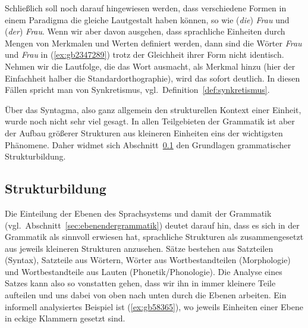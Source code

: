Schließlich soll noch darauf hingewiesen werden, dass verschiedene Formen in einem Paradigma die gleiche Lautgestalt haben können, so wie (\textit{die}) \textit{Frau} und (\textit{der}) \textit{Frau}.
Wenn wir aber davon ausgehen, dass sprachliche Einheiten durch Mengen von Merkmalen und Werten definiert werden, dann sind die Wörter \textit{Frau} und \textit{Frau} in (\ref{ex:gb2347289}) trotz der Gleichheit ihrer Form nicht identisch.
Nehmen wir die Lautfolge, die das Wort ausmacht, als Merkmal hinzu (hier der Einfachheit halber die Standardorthographie), wird das sofort deutlich.
In diesen Fällen spricht man von Synkretismus, vgl.\ Definition~\ref{def:synkretismus}.

\begin{exe}
  \ex\label{ex:gb2347289}
  \begin{xlist}
  \end{xlist}
\end{exe}


Über das Syntagma, also ganz allgemein den strukturellen Kontext einer Einheit, wurde noch nicht sehr viel gesagt.
In allen Teilgebieten der Grammatik ist aber der Aufbau größerer Strukturen aus kleineren Einheiten eins der wichtigsten Phänomene.
Daher widmet sich Abschnitt~\ref{sec:strukturbildung} den Grundlagen grammatischer Strukturbildung.

\subsection{Strukturbildung}
\label{sec:strukturbildung}

Die Einteilung der Ebenen des Sprachsystems und damit der Grammatik (vgl.\ Abschnitt~\ref{sec:ebenendergrammatik}) deutet darauf hin, dass es sich in der Grammatik als sinnvoll erwiesen hat, sprachliche Strukturen als zusammengesetzt aus jeweils kleineren Strukturen anzusehen.
Sätze bestehen aus Satzteilen (Syntax), Satzteile aus Wörtern, Wörter aus Wortbestandteilen (Morphologie) und Wortbestandteile aus Lauten (Phonetik\slash Phonologie).
Die Analyse eines Satzes kann also so vonstatten gehen, dass wir ihn in immer kleinere Teile aufteilen und uns dabei von oben nach unten durch die Ebenen arbeiten.
Ein informell analysiertes Beispiel ist (\ref{ex:gb58365}), wo jeweils Einheiten einer Ebene in eckige Klammern gesetzt sind.

